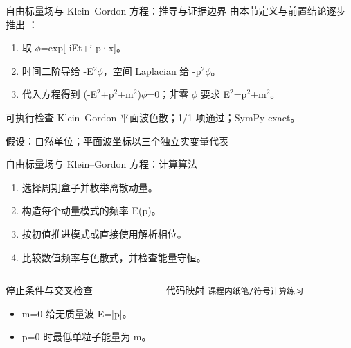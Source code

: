 \begin{frame}[t]{自由标量场与 Klein--Gordon 方程：推导与证据边界}
\footnotesize
{}\quad 由本节定义与前置结论逐步推出 ：
\begin{enumerate}
\item 取 \ensuremath{\phi}=exp[-iEt+i p·x]。
\item 时间二阶导给 -E\ensuremath{^{2}}\ensuremath{\phi}，空间 Laplacian 给 -p\ensuremath{^{2}}\ensuremath{\phi}。
\item 代入方程得到 (-E\ensuremath{^{2}}+p\ensuremath{^{2}}+m\ensuremath{^{2}})\ensuremath{\phi}=0；非零 \ensuremath{\phi} 要求 E\ensuremath{^{2}}=p\ensuremath{^{2}}+m\ensuremath{^{2}}。
\end{enumerate}\begin{block}{可执行检查}
\quad Klein--Gordon 平面波色散；1/1 项通过；SymPy exact。
\par\scriptsize 假设：自然单位；平面波坐标以三个独立实变量代表
\end{block}
\end{frame}

\begin{frame}[t]{自由标量场与 Klein--Gordon 方程：计算算法}
\footnotesize
{}\begin{enumerate}
\item 选择周期盒子并枚举离散动量。
\item 构造每个动量模式的频率 E(p)。
\item 按初值推进模式或直接使用解析相位。
\item 比较数值频率与色散式，并检查能量守恒。
\end{enumerate}\begin{columns}[T,onlytextwidth]
\begin{block}{停止条件与交叉检查}\scriptsize\begin{itemize}
\item[\CheckMark] m=0 给无质量波 E=|p|。
\item[\CheckMark] p=0 时最低单粒子能量为 m。
\end{itemize}\end{block}
\begin{block}{代码映射}
\scriptsize \texttt{课程内纸笔/\allowbreak{}符号计算练习}
\end{block}\end{columns}\end{frame}

